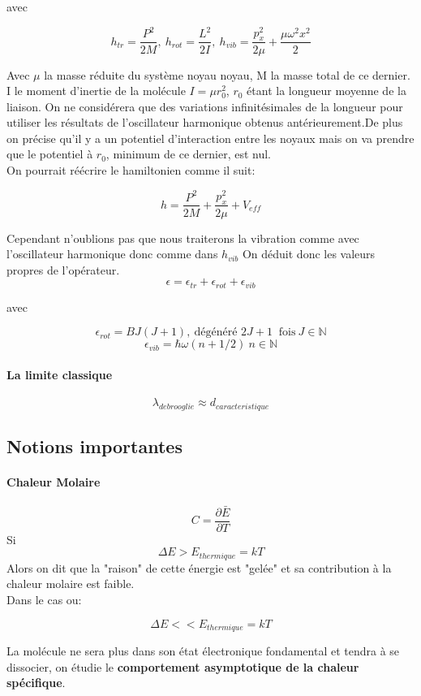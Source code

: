 avec 

\[
	h_{tr}=\frac{P^2}{2M},\  h_{rot}=\frac{L^2}{2I}, \ h_{vib}=\frac{p^2_x}{2\mu}+\frac{\mu\omega^2x^2}{2}
\]

Avec $\mu$ la masse réduite du système noyau noyau, M la masse total de ce dernier.  I le moment d'inertie de la molécule $I=\mu r_0^2$, $r_0$ étant la longueur moyenne de la liaison. On ne considérera que des variations infinitésimales de la longueur pour utiliser les résultats de l'oscillateur harmonique obtenus antérieurement.De plus on précise qu'il y a un potentiel d'interaction entre les noyaux mais on va prendre que le potentiel à $r_0$, minimum de ce dernier, est nul.  \\
On pourrait réécrire le hamiltonien comme il suit:

\[
	h=\frac{P^2}{2M}+\frac{p^2_x}{2\mu}+V_{eff}
\]

Cependant n'oublions pas que nous traiterons la vibration comme avec l'oscillateur harmonique donc comme dans $h_{vib}$
On déduit donc les valeurs propres de l'opérateur.
\[
	\epsilon=\epsilon_{tr}+\epsilon_{rot}+\epsilon_{vib}
\]

avec

\[
	\epsilon_{rot}=BJ(J+1),\ \text{dégénéré } 2J+1 \ \text{ fois}\ J\in \mathbb{N}
\]
\[
	\epsilon_{vib}= \hbar\omega(n+1/2) \ n\in \mathbb{N}
\]


\paragraph{La limite classique} 

\[
	\lambda_{de brooglie}\approx d_{caracteristique}
\]


\subsection{Notions importantes}


\paragraph{Chaleur Molaire}

\[
	 C= \frac{\partial \bar{E}}{\partial T}
\]
Si 
\[
	\Delta E > E_{thermique} =kT
\]
Alors on dit que la "raison" de cette énergie est "gelée" et sa contribution à la chaleur molaire est faible. \\
Dans le cas ou:

\[
	\Delta E << E_{thermique} =kT
\]

La molécule ne sera plus dans son état électronique fondamental et tendra à se dissocier, on étudie le \textbf{comportement asymptotique de la chaleur spécifique}.



